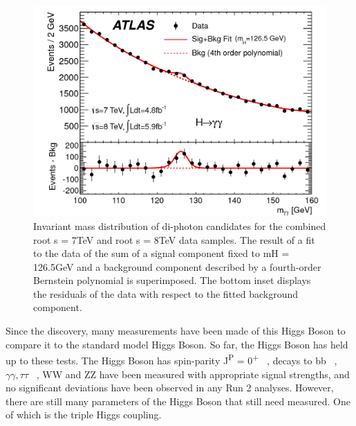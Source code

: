 \begin{figure}[h]
\begin{center}
\includegraphics[scale=0.25]{figures/higgs_disc}
\caption[Higgs boson mass peak]{Invariant mass distribution of di-photon candidates for the combined root s = 7TeV and root s = 8TeV data samples. The result of a fit to the data of the sum of a signal component fixed to mH = 126.5GeV and a background component described by a fourth-order Bernstein polynomial is superimposed. The bottom inset displays the residuals of the data with respect to the fitted background component.}
\label{fig:Higgs}
\end{center}
\end{figure}

Since the discovery, many measurements have been made of this Higgs Boson to compare it to the standard model Higgs Boson. So far, the Higgs Boson has held up to these tests. The Higgs Boson has spin-parity J\textsuperscript{P} = 0\textsuperscript{+} ~\cite{Aad:2013xqa}, decays to bb ~\cite{Aaboud:2018zhk}, ${\gamma\gamma, \tau\tau}$ ~\cite{Aaboud:2018pen}, WW and ZZ have been measured with appropriate signal strengths, and no significant deviations have been observed in any Run 2 analyses. However, there are still many parameters of the Higgs Boson that still need measured. One of which is the triple Higgs coupling.
